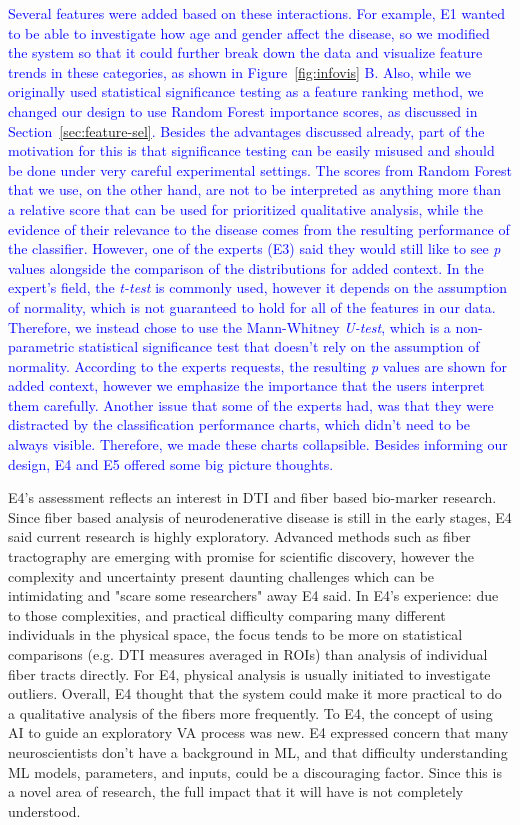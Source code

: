 \textcolor{blue}{Several features were added based on these interactions. For example, E1 wanted to be able to investigate how age and gender affect the disease, so we modified the system so that it could further break down the data and visualize feature trends in these categories, as shown in Figure~\ref{fig:infovis} B. Also, while we originally used statistical significance testing as a feature ranking method, we changed our design to use Random Forest importance scores, as discussed in Section~\ref{sec:feature-sel}. Besides the advantages discussed already, part of the motivation for this is that significance testing can be easily misused and should be done under very careful experimental settings. The scores from Random Forest that we use, on the other hand, are not to be interpreted as anything more than a relative score that can be used for prioritized qualitative analysis, while the evidence of their relevance to the disease comes from the resulting performance of the classifier. However, one of the experts (E3) said they would still like to see \textit{p} values alongside the comparison of the distributions for added context. In the expert's field, the \textit{t-test} is commonly used, however it depends on the assumption of normality, which is not guaranteed to hold for all of the features in our data. Therefore, we instead chose to use the Mann-Whitney \textit{U-test}, which is a non-parametric statistical significance test that doesn't rely on the assumption of normality. According to the experts requests, the resulting \textit{p} values are shown for added context, however we emphasize the importance that the users interpret them carefully. Another issue that some of the experts had, was that they were distracted by the classification performance charts, which didn't need to be always visible. Therefore, we made these charts collapsible. Besides informing our design, E4 and E5 offered some big picture thoughts.}

E4's assessment reflects an interest in DTI and fiber based bio-marker research. Since fiber based analysis of neurodenerative disease is still in the early stages, E4 said current research is highly exploratory. Advanced methods such as fiber tractography are emerging with promise for scientific discovery, however the complexity and uncertainty present daunting challenges which can be intimidating and "scare some researchers" away E4 said. In E4's experience: due to those complexities, and practical difficulty comparing many different individuals in the physical space, the focus tends to be more on statistical comparisons (e.g. DTI measures averaged in ROIs) than analysis of individual fiber tracts directly. For E4, physical analysis is usually initiated to investigate outliers. Overall, E4 thought that the system could make it more practical to do a qualitative analysis of the fibers more frequently. To E4, the concept of using AI to guide an exploratory VA process was new. E4 expressed concern that many neuroscientists don't have a background in ML, and that difficulty understanding ML models, parameters, and inputs, could be a discouraging factor. Since this is a novel area of research, the full impact that it will have is not completely understood. 

